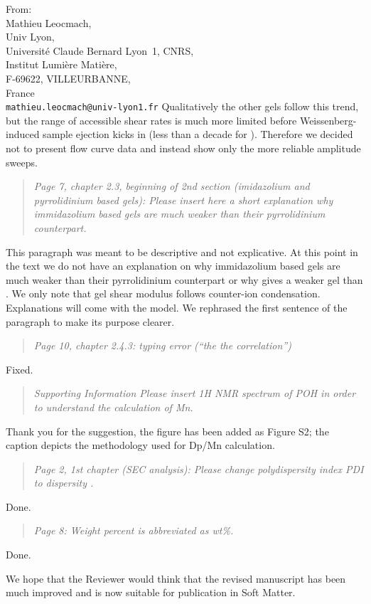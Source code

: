 \documentclass[a4paper, parskip=true, firsthead=false, fromemail=true, foldmarks=false]{scrlttr2}
\newenvironment{quotationi}
{\begin{quotation}\itshape}
{\end{quotation}}
\newcommand{\journal}{Soft Matter}
\begin{document}
\begin{letter}{From:\\
Mathieu Leocmach,\\
Univ Lyon,\\ 
Universit\'e Claude Bernard Lyon~1, CNRS,\\
Institut Lumi\`ere Mati\`ere,\\
F-69622, VILLEURBANNE,\\
France\\
\texttt{mathieu.leocmach@univ-lyon1.fr}
}
Qualitatively the other gels follow this trend, but the range of accessible shear rates is much more limited before Weissenberg-induced sample ejection kicks in (less than a decade for ). Therefore we decided not to present flow curve data and instead show only the more reliable amplitude sweeps.



\begin{quotationi}
Page 7, chapter 2.3, beginning of 2nd section (imidazolium and pyrrolidinium based gels): Please insert here a short explanation why immidazolium based gels are much weaker than their pyrrolidinium counterpart.
\end{quotationi}

This paragraph was meant to be descriptive and not explicative. At this point in the text we do not have an explanation on why immidazolium based gels are much weaker than their pyrrolidinium counterpart or why  gives a weaker gel than . We only note that gel shear modulus follows counter-ion condensation. Explanations will come with the model. We rephrased the first sentence of the paragraph to make its purpose clearer.

\begin{quotationi}
Page 10, chapter 2.4.3: typing error (“the the correlation”)
\end{quotationi}

Fixed.

\begin{quotationi}
Supporting Information
Please insert 1H NMR spectrum of POH in order to understand the calculation of Mn.
\end{quotationi}

Thank you for the suggestion, the figure has been added as Figure S2; the caption depicts the methodology used for Dp/Mn calculation.

\begin{quotationi}
Page 2, 1st chapter (SEC analysis): Please change polydispersity index PDI to dispersity \DJ.
\end{quotationi}

Done.

\begin{quotationi}
Page 8: Weight percent is abbreviated as wt\%.
\end{quotationi}

Done.



We hope that the Reviewer would think that the revised manuscript has been much improved and is now suitable for publication in \journal. 
 

\end{letter}
\end{document}
